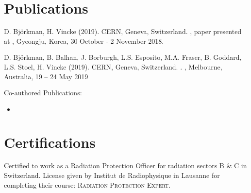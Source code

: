 \documentclass[a4paper,10pt]{article}
\newcommand{\MYhref}[3][blue]{\href{#2}{\color{#1}{#3}}}%
\begin{document}
 
 
 
 
 
 
\section{Publications}
\begin{enumerate}[label={[\arabic*]}]
  \item D. Björkman, H. Vincke (2019). CERN, Geneva, Switzerland. \MYhref{https://www.oecd-nea.org/science/wprs/egsaatif/}{"High Energy Internal Beam Dump System for the Super Proton Synchrotron"}, paper presented at , Gyeongju, Korea, 30 October - 2 November 2018.
 
  \item D. Björkman, B. Balhan, J. Borburgh, L.S. Esposito, M.A. Fraser, B. Goddard, L.S. Stoel, H. Vincke (2019).   CERN, Geneva, Switzerland. \MYhref{http://accelconf.web.cern.ch/AccelConf/ipac2019/papers/wepmp024.pdf}{"Alternative Material Choices to Reduce Activation of Extraction Equipment"}. , Melbourne, Australia, 19 – 24 May 2019
\end{enumerate}
\hspace{7.5mm} Co-authored Publications: \
\begin{itemize}
\setlength{\itemindent}{4mm}
\item \MYhref{https://ipac2019.vrws.de/papers/wepmp031.pdf}{"SPS Slow Extraction Losses and Activation: Update on Recent Improvements"}
\end{itemize}

 
\section{Certifications}
Certified to work as a Radiation Protection Officer for radiation sectors B $\&$ C in Switzerland. License given by Institut de Radiophysique in Lausanne for completing their course: \textsc{Radiation Protection Expert}.
 
 
\end{document}
